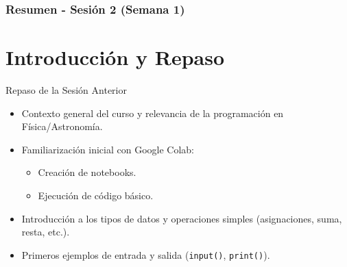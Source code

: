 \documentclass[10pt]{beamer}
\begin{document}
\myfront{}

\begin{frame}
  \titlepage
\end{frame}

\begin{frame}
  \frametitle{Resumen - Sesión 2 (Semana 1)}
  \tableofcontents
\end{frame}


\section{Introducción y Repaso}

\begin{frame}{Repaso de la Sesión Anterior}
  \begin{itemize}
    \item Contexto general del curso y relevancia de la programación en Física/Astronomía.
    \item Familiarización inicial con Google Colab:
      \begin{itemize}
        \item Creación de notebooks.
        \item Ejecución de código básico.
      \end{itemize}
    \item Introducción a los tipos de datos y operaciones simples (asignaciones, suma, resta, etc.).
    \item Primeros ejemplos de entrada y salida (\texttt{input()}, \texttt{print()}).
  \end{itemize}
\end{frame}
\end{document}
